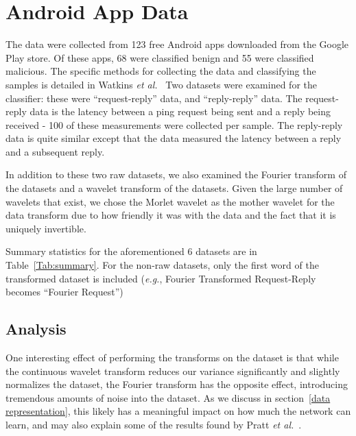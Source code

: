 \documentclass[10pt]{article}
\begin{document}
\section{Android App Data}
The data were collected from 123 free Android apps downloaded from the Google Play store. 
Of these apps, 68 were classified benign and 55 were classified malicious.
The specific methods for collecting the data and classifying the samples is detailed in Watkins \textit{et al.}~\cite{watkins2018network}
Two datasets were examined for the classifier: these were ``request-reply'' data, and ``reply-reply'' data.
The request-reply data is the latency between a ping request being sent and a reply being received - 100 of these measurements were collected per sample.
The reply-reply data is quite similar except that the data measured the latency between a reply and a subsequent reply.

In addition to these two raw datasets, we also examined the Fourier transform of the datasets and a wavelet transform of the datasets. 
Given the large number of wavelets that exist, we chose the Morlet wavelet as the mother wavelet for the data transform due to how friendly it was with the data and the fact that it is uniquely invertible.

Summary statistics for the aforementioned 6 datasets are in Table~\ref{Tab:summary}. 
For the non-raw datasets, only the first word of the transformed dataset is included (\textit{e.g.}, Fourier Transformed Request-Reply becomes ``Fourier Request'')

\subsection{Analysis}
One interesting effect of performing the transforms on the dataset is that while the continuous wavelet transform reduces our variance significantly and slightly normalizes the dataset, the Fourier transform has the opposite effect, introducing tremendous amounts of noise into the dataset.
As we discuss in section~\ref{data representation}, this likely has a meaningful impact on how much the network can learn, and may also explain some of the results found by Pratt \textit{et al.}~\cite{pratt2017fcnn}.
\end{document}
